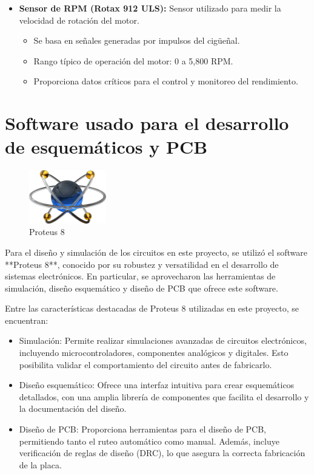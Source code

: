 \begin{itemize}
    \item \textbf{Sensor de RPM (Rotax 912 ULS):}  
    Sensor utilizado para medir la velocidad de rotación del motor.  
    \begin{itemize}
        \item Se basa en señales generadas por impulsos del cigüeñal.  
        \item Rango típico de operación del motor: 0 a 5,800 RPM.  
        \item Proporciona datos críticos para el control y monitoreo del rendimiento.  
    \end{itemize}
\end{itemize}

     
    
\section{Software usado para el desarrollo de esquemáticos y PCB}

\begin{figure}[h]
    \centering
    \includegraphics[width=0.3\textwidth]{Imagenes/logo proteus (2).png}
    \caption{Proteus 8}
    \label{fig:logo_proteus}
\end{figure}

Para el diseño y simulación de los circuitos en este proyecto, se utilizó el software **Proteus 8**, conocido por su robustez y versatilidad en el desarrollo de sistemas electrónicos. En particular, se aprovecharon las herramientas de simulación, diseño esquemático y diseño de PCB que ofrece este software.

Entre las características destacadas de Proteus 8 utilizadas en este proyecto, se encuentran:

\begin{itemize}
    \item Simulación: %
    Permite realizar simulaciones avanzadas de circuitos electrónicos, incluyendo microcontroladores, componentes analógicos y digitales. Esto posibilita validar el comportamiento del circuito antes de fabricarlo.
    \item Diseño esquemático: %
    Ofrece una interfaz intuitiva para crear esquemáticos detallados, con una amplia librería de componentes que facilita el desarrollo y la documentación del diseño.
    \item Diseño de PCB: %
    Proporciona herramientas para el diseño de PCB, permitiendo tanto el ruteo automático como manual. Además, incluye verificación de reglas de diseño (DRC), lo que asegura la correcta fabricación de la placa.
\end{itemize}

